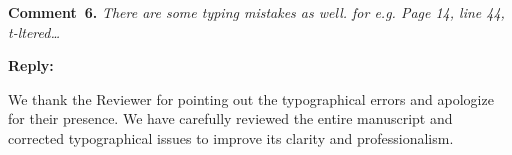 \documentclass[a4paper,fleqn]{cas-sc}
\begin{document}
%
%
%
%
%


\vspace{1cm}
\noindent
\textcolor[rgb]{0.00,0.50,1.00}{\textbf{Comment~6.}}
\emph{There are some typing mistakes as well. for e.g. Page 14, line 44, t-ltered…}

\noindent
\textcolor[rgb]{0.51,0.00,0.00}{\textbf{Reply:}}

We thank the Reviewer for pointing out the typographical errors and apologize for their presence.
We have carefully reviewed the entire manuscript and corrected typographical issues to improve its clarity and  professionalism.
\end{document}
